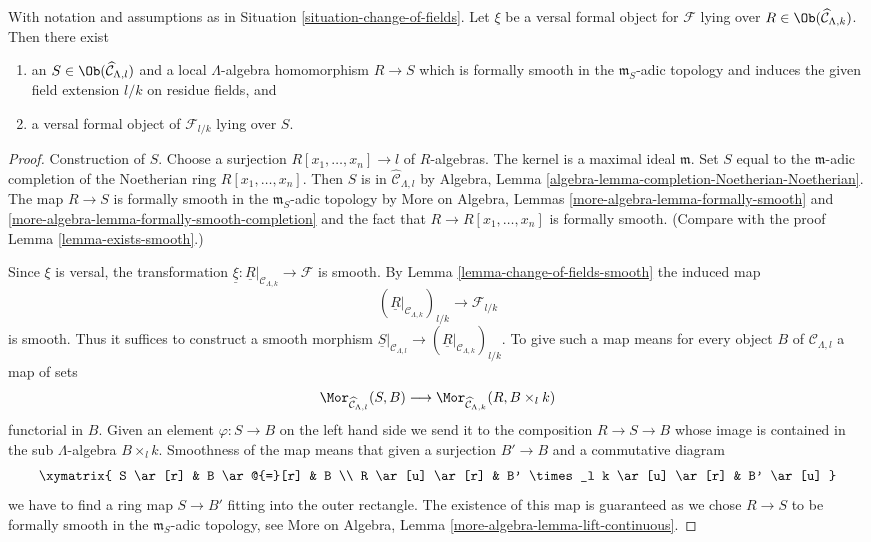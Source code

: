 \begin{lemma}
\label{lemma-change-of-field-versal-ring}
With notation and assumptions as in Situation \ref{situation-change-of-fields}.
Let $\xi$ be a versal formal object for $\mathcal{F}$ lying over
$R \in \Ob(\widehat{\mathcal{C}}_{\Lambda, k})$. Then there exist
\begin{enumerate}
\item an $S \in \Ob(\widehat{\mathcal{C}}_{\Lambda, l})$
and a local $\Lambda$-algebra homomorphism $R \to S$ which is
formally smooth in the $\mathfrak m_S$-adic topology and induces
the given field extension $l/k$ on residue fields, and
\item a versal formal object of $\mathcal{F}_{l/k}$ lying over $S$.
\end{enumerate}
\end{lemma}

\begin{proof}
Construction of $S$. Choose a surjection $R[x_1, \ldots, x_n] \to l$
of $R$-algebras. The kernel is a maximal ideal $\mathfrak m$.
Set $S$ equal to the $\mathfrak m$-adic completion of the Noetherian ring
$R[x_1, \ldots, x_n]$. Then $S$ is in $\widehat{\mathcal{C}}_{\Lambda, l}$
by Algebra, Lemma \ref{algebra-lemma-completion-Noetherian-Noetherian}.
The map $R \to S$ is formally smooth in the $\mathfrak m_S$-adic topology by
More on Algebra, Lemmas
\ref{more-algebra-lemma-formally-smooth} and
\ref{more-algebra-lemma-formally-smooth-completion}
and the fact that $R \to R[x_1, \ldots, x_n]$ is formally smooth.
(Compare with the proof Lemma \ref{lemma-exists-smooth}.)

\medskip\noindent
Since $\xi$ is versal, the transformation
$\underline{\xi} : \underline{R}|_{\mathcal{C}_{\Lambda, k}} \to \mathcal{F}$
is smooth. By Lemma \ref{lemma-change-of-fields-smooth} the induced map
$$
(\underline{R}|_{\mathcal{C}_{\Lambda, k}})_{l/k}
\longrightarrow
\mathcal{F}_{l/k}
$$
is smooth. Thus it suffices to construct a smooth morphism
$\underline{S}|_{\mathcal{C}_{\Lambda, l}} \to
(\underline{R}|_{\mathcal{C}_{\Lambda, k}})_{l/k}$.
To give such a map means for every object $B$ of $\mathcal{C}_{\Lambda, l}$
a map of sets
$$
\Mor_{\widehat{\mathcal{C}}_{\Lambda, l}}(S, B)
\longrightarrow
\Mor_{\widehat{\mathcal{C}}_{\Lambda, k}}(R, B \times_l k)
$$
functorial in $B$. Given an element $\varphi : S \to B$
on the left hand side we send it to the composition $R \to S \to B$
whose image is contained in the sub $\Lambda$-algebra $B \times_l k$.
Smoothness of the map means that given a surjection
$B' \to B$ and a commutative diagram
$$
\xymatrix{
S \ar[r] & B \ar@{=}[r] & B \\
R \ar[u] \ar[r] & B' \times_l k \ar[u] \ar[r] & B' \ar[u]
}
$$
we have to find a ring map $S \to B'$ fitting into the outer rectangle.
The existence of this map is guaranteed as we chose $R \to S$ to be
formally smooth in the $\mathfrak m_S$-adic topology, see
More on Algebra, Lemma \ref{more-algebra-lemma-lift-continuous}.
\end{proof}